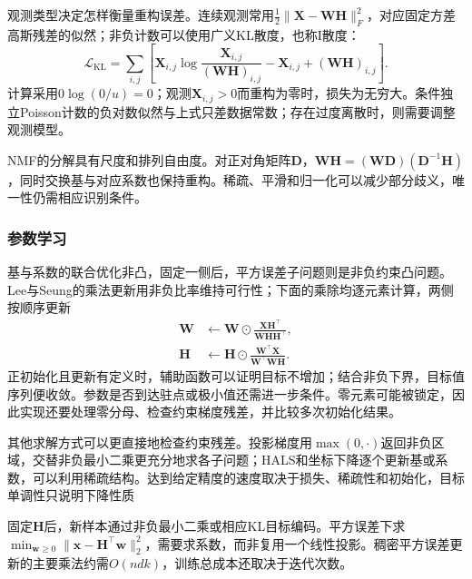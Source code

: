 观测类型决定怎样衡量重构误差。连续观测常用$\frac12\lVert\bm{X}-\bm{W}\bm{H}\rVert_F^2$，对应固定方差高斯残差的似然；非负计数可以使用广义KL散度，也称I散度：
\begin{equation}
  \mathcal{L}_{\mathrm{KL}}
  =\sum_{i,j}\left[
      \bm{X}_{i,j}\log\frac{\bm{X}_{i,j}}{(\bm{W}\bm{H})_{i,j}}
      -\bm{X}_{i,j}+(\bm{W}\bm{H})_{i,j}\right].
  \label{eq:dim-nmf-kl}
\end{equation}
计算采用$0\log(0/u)=0$；观测$\bm{X}_{i,j}>0$而重构为零时，损失为无穷大。条件独立Poisson计数的负对数似然与上式只差数据常数；存在过度离散时，则需要调整观测模型。

NMF的分解具有尺度和排列自由度。对正对角矩阵$\bm{D}$，$\bm{W}\bm{H}=(\bm{W}\bm{D})(\bm{D}^{-1}\bm{H})$，同时交换基与对应系数也保持重构。稀疏、平滑和归一化可以减少部分歧义，唯一性仍需相应识别条件。

\subsubsection{参数学习}
\label{sec:dim-nmf-learning}

基与系数的联合优化非凸，固定一侧后，平方误差子问题则是非负约束凸问题。Lee与Seung的乘法更新用非负比率维持可行性；下面的乘除均逐元素计算，两侧按顺序更新
\begin{equation}
  \begin{aligned}
    \bm{W}&\leftarrow\bm{W}\odot
       \frac{\bm{X}\bm{H}^{\top}}
        {\bm{W}\bm{H}\bm{H}^{\top}},\\
    \bm{H}&\leftarrow\bm{H}\odot
       \frac{\bm{W}^{\top}\bm{X}}
        {\bm{W}^{\top}\bm{W}\bm{H}}.
  \end{aligned}
  \label{eq:dim-nmf-mu}
\end{equation}
正初始化且更新有定义时，辅助函数可以证明目标不增加；结合非负下界，目标值序列便收敛。参数是否到达驻点或极小值还需进一步条件。零元素可能被锁定，因此实现还要处理零分母、检查约束梯度残差，并比较多次初始化结果。

其他求解方式可以更直接地检查约束残差。投影梯度用$\max(0,\cdot)$返回非负区域，交替非负最小二乘更充分地求各子问题；HALS和坐标下降逐个更新基或系数，可以利用稀疏结构。达到给定精度的速度取决于损失、稀疏性和初始化，目标单调性只说明下降性质

固定$\bm{H}$后，新样本通过非负最小二乘或相应KL目标编码。平方误差下求$\min_{\bm{w}\geq0}\lVert\bm{x}-\bm{H}^{\top}\bm{w}\rVert_2^2$，需要求系数，而非复用一个线性投影。稠密平方误差更新的主要乘法约需$O(ndk)$，训练总成本还取决于迭代次数。

